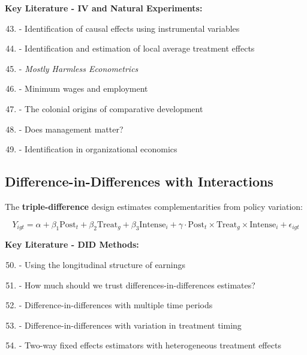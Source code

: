 \textbf{Key Literature - IV and Natural Experiments:}
\begin{enumerate}[noitemsep]
    \setcounter{enumi}{42}
    \item \citet{angrist1996} - Identification of causal effects using instrumental variables
    \item \citet{imbens1994} - Identification and estimation of local average treatment effects
    \item \citet{angrist2009} - \textit{Mostly Harmless Econometrics}
    \item \citet{card1994} - Minimum wages and employment
    \item \citet{acemoglu2001} - The colonial origins of comparative development
    \item \citet{bloom2013} - Does management matter?
    \item \citet{gibbons2010} - Identification in organizational economics
\end{enumerate}

\subsection{Difference-in-Differences with Interactions}
\label{subsec:did-interactions}

The \textbf{triple-difference} design estimates complementarities from policy variation:

\begin{equation}
Y_{igt} = \alpha + \beta_1 \text{Post}_t + \beta_2 \text{Treat}_g + \beta_3 \text{Intense}_i + \gamma \cdot \text{Post}_t \times \text{Treat}_g \times \text{Intense}_i + \epsilon_{igt}
\label{eq:triple-diff}
\end{equation}

\textbf{Key Literature - DID Methods:}
\begin{enumerate}[noitemsep]
    \setcounter{enumi}{49}
    \item \citet{ashenfelter1985} - Using the longitudinal structure of earnings
    \item \citet{bertrand2004} - How much should we trust differences-in-differences estimates?
    \item \citet{callaway2021} - Difference-in-differences with multiple time periods
    \item \citet{goodman2021} - Difference-in-differences with variation in treatment timing
    \item \citet{dechaisemartin2020} - Two-way fixed effects estimators with heterogeneous treatment effects
\end{enumerate}

